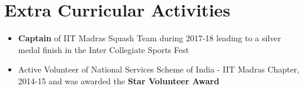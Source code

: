 \documentclass[letterpaper,11pt]{article}
\newcommand{\ritem}[1]{
  \item\small{
    {#1 \vspace{-2pt}}
  }
}
\newcommand{\resumeItemListStart}{\begin{itemize}[leftmargin=*]}
\newcommand{\resumeItemListEnd}{\end{itemize}\vspace{-4pt}}
\begin{document}
\section{Extra Curricular Activities}
  \resumeItemListStart
    \justifying\ritem{\textbf{Captain} of IIT Madras Squash Team during 2017-18 leading to a silver medal finish in the Inter Collegiate Sports Fest}
    \justifying\ritem{Active Volunteer of National Services Scheme of India - IIT Madras Chapter, 2014-15 and was awarded the \textbf{Star Volunteer Award}}
  \resumeItemListEnd

\end{document}
